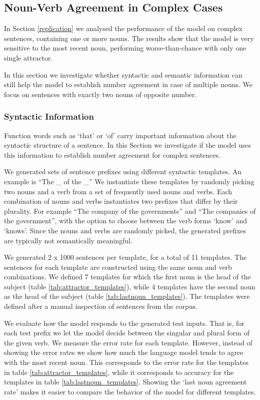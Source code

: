 \begin{multicols}{2}
 
\subsection{Noun-Verb Agreement in Complex Cases}

In Section \ref{replication} we analysed the performance of the model
on complex sentences, containing one or more 
nouns.
The results show that the model is very
sensitive to the most recent noun,
performing worse-than-chance with only one single attractor.

In this section we investigate whether
syntactic and semantic information
can still help the model 
to establish number agreement
in case of multiple nouns.
We focus on sentences with exactly two nouns
of opposite number.


\subsubsection{Syntactic Information}

Function words such as `that' or `of' carry 
important information about the syntactic structure of a sentence.
In this Section we investigate if the model
uses this information to establish number agreement
for complex sentences.

We generated sets of sentence prefixes using 
different syntactic templates.
An example is ``The \_ of the \_''
We instantiate these templates by randomly
picking two nouns and a verb 
from a set of frequently used nouns and verbs. 
Each combination of nouns and verbs instantiates
two prefixes that differ by their plurality.
For example ``The company of the governments''
and ``The companies of the government'',
with the option to choose between the verb forms
`know' and `knows'.
Since the nouns and verbs are randomly picked,
the generated prefixes 
are typically not semantically
meaningful.

We generated 2 x 1000 sentences per template,
for a total of 11 templates.
The sentences for each template are constructed using the same
noun and verb combinations.
We defined 7 templates for which the first noun is 
the head of the subject (table \ref{tab:attractor_templates}),
while 4 templates have the second noun as the head of the subject
(table \ref{tab:lastnoun_templates}).
The templates were defined after a manual inspection
of sentences from the corpus.

We evaluate how the model responds to the generated test inputs.
That is, for each test prefix we let the model decide between 
the singular and plural form of the given verb. 
We measure the error rate for each template.
However, instead of showing the error rates we
show how much the language model tends to agree with the most recent noun.
This corresponds to the error rate for the templates in table \ref{tab:attractor_templates},
while it corresponds to accuracy for the templates in table \ref{tab:lastnoun_templates}.
Showing the `last noun agreement rate' makes it easier
to compare the behavior of the model for different templates.


\end{multicols}
